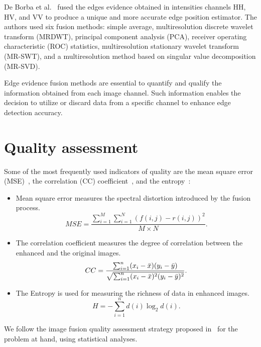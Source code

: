 \documentclass{article}
\begin{document}
De Borba et al.~\cite{DeBorba2020} fused the edges evidence obtained in intensities channels HH, HV, and VV to produce a unique and more accurate edge position estimator. 
The authors used six fusion methods: simple average, multiresolution discrete wavelet transform (MRDWT), principal component analysis (PCA), receiver operating characteristic (ROC) statistics, multiresolution stationary wavelet transform (MR-SWT), and a multiresolution method based on singular value decomposition (MR-SVD).

Edge evidence fusion methods are essential to quantify and qualify the information obtained from each image channel. 
Such information enables the decision to utilize or discard data from a specific channel to enhance edge detection accuracy.

\section{Quality assessment}

Some of the most frequently used indicators of quality are the mean square error (MSE)~\cite{beaulieu2003multi}, 
the correlation (CC) coefficient~\cite{aiazzi2004spectral}, and the entropy~\cite{han2008study}:
\begin{itemize}
	\item Mean square error measures the spectral distortion introduced by the fusion process.
	$$MSE= \displaystyle \frac{\sum_{i=1}^{M}\sum_{i=1}^{N}(f(i,j)-r(i,j))^2}{M\times N}.$$
	\item The correlation coefficient measures the degree of correlation between the enhanced and the original images.
	$$CC=  \frac{\sum_{i=1}^{n}(x_i-\Bar{x})(y_i-\Bar{y})}{\sqrt{\sum_{i=1}^{n}(x_i-\Bar{x})^2(y_i-\Bar{y})^2}}.$$
	\item The Entropy is used for measuring the richness of data in enhanced images.
	$$H=-\sum_{i=1}^{n}d(i)\log_2d(i).$$
\end{itemize}

We follow the image fusion quality assessment strategy proposed in~\cite{Li2010, Somvanshi2017,Nikola2015} for the problem at hand, using statistical analyses.


\end{document}
